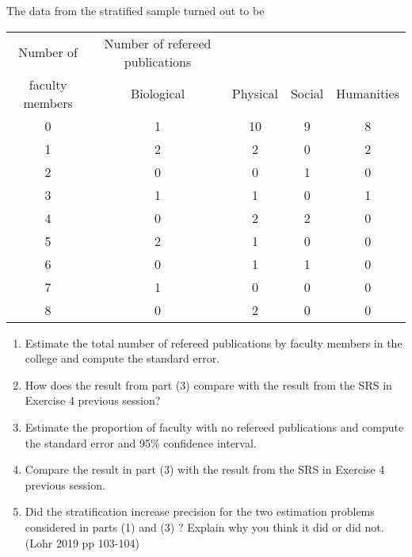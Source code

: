 \documentclass[12pt]{article}
\begin{document}
The data from the stratified sample turned out to be
\begin{center}
\begin{tabular}{c|cccc}
Number of & Number of refereed publications \\
faculty members & Biological & Physical & Social & Humanities\\
\hline
0&	1	&10	&9	&8\\
1&	2	&2	&0	&2\\
2&	0	&0	&1	&0\\
3&	1	&1	&0	&1\\
4&	0	&2	&2	&0\\
5&	2	&1	&0	&0\\
6&	0	&1	&1	&0\\
7&	1	&0	&0	&0\\
8&	0	&2	&0	&0\\

\end{tabular}
\end{center}

\begin{enumerate}
\item Estimate the total number of refereed publications by faculty members in the college and compute the standard error.
\item How does the result from part (3) compare with the result from the SRS in Exercise 4 previous session?
\item Estimate the proportion of faculty with no refereed publications and compute the standard error and 95\% confidence interval.
\item Compare the result in part (3) with the result from the SRS in Exercise 4 previous session.
\item Did the stratification increase precision for the two estimation problems considered in parts (1) and (3) ? Explain why you think it did or did not.\hfill{(Lohr 2019 pp 103-104)}
\end{enumerate}
\end{document}

